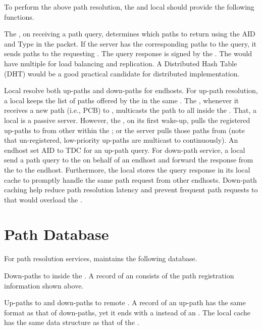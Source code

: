 To perform the above path resolution, the \ISDC \PS and local \PS should provide the following functions.

\noindent {\bf \ISDC \PS: } The \ISDC \PS, on receiving a path query, determines which paths to return using the AID and Type in the packet. If the server has the corresponding paths to the query, it sends paths to the requesting \AD. The query response is signed by the \ISDC \PS.  The \ISDC would have multiple \PSs for load balancing and replication. A Distributed Hash Table (DHT) would be a good practical candidate for distributed \PS implementation. 


 Local \PSs resolve both up-paths and down-paths for endhosts. For up-path resolution, a local \PS keeps the list of paths offered by the \BS in the same \AD. The \BS, whenever it receives a new path (i.e., PCB) to \ISDC,  multicasts the path to all \PSs inside the \AD. That, a local \PS is a passive server. However, the \PS, on its first wake-up, pulls the registered up-paths to \ISDC from other \PSs within the \AD; or the server pulls those paths from \ISDC (note that un-registered, low-priority up-paths are multicast to \PSs continuously). An endhost set AID to TDC for an up-path query. For down-path service, a local \PS send a path query to the \ISDC on behalf of an endhost and forward the response from the \ISDC to the endhost. Furthermore, the local \PS stores the query response in its local cache to promptly handle the same path request from other endhosts. Down-path caching help reduce path resolution latency and prevent frequent path requests to \ISDC that would overload the \ISDC \PSs.



\section{Path Database}
For path resolution services, \PSs maintains the following database.

\noindent {\bf \ISDC \PS: } Down-paths to \STUB \ADs inside the \ISD. \newline
A record of an \STUB \AD consists of the path registration information shown above.

 Up-paths to \ISDC and down-paths to remote \STUB \ADs.
A record of an up-path has the same format as that of down-paths, yet it ends with a \ISDC \AD instead of an \STUB \AD. The local \PS cache has the same data structure as that of the \ISDC \PS.

